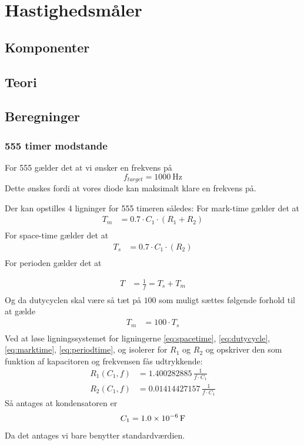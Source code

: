 \section{Hastighedsmåler}


\subsection{Komponenter}

\subsection{Teori}



\subsection{Beregninger}
\subsubsection{555 timer modstande}
For 555 gælder det at vi ønsker en frekvens på 
\[
	f_{target} =  \SI{1000}{\hertz}
\]
Dette ønskes fordi at vores diode kan maksimalt klare en frekvens på.

Der kan opstilles 4 ligninger for 555 timeren således: 
For mark-time gælder det at
\begin{align}
	T_m &= 0.7 \cdot C_1 \cdot (R_1 + R_2) \label{eq:marktime} \\
\end{align}
For space-time gælder det at 
\begin{align}
	T_s &= 0.7 \cdot C_1 \cdot (R_2) \label{eq:spacetime} \\
\end{align}
For perioden gælder det at 

\begin{align}
	T &= \frac{1}{f} = T_s + T_m \label{eq:periodtime} \\
\end{align}
Og da dutycyclen skal være så tæt på $100$ som muligt sættes følgende forhold til at gælde
\begin{align}
	T_m &= 100 \cdot  T_s \label{eq:dutycycle} \\
\end{align}
Ved at løse ligningssystemet for ligningerne \ref{eq:spacetime}, \ref{eq:dutycycle}, \ref{eq:marktime}, \ref{eq:periodtime}, og isolerer for $R_1$ og $R_2$ og opskriver den som funktion af kapacitoren og frekvensen fås udtrykkende:
\begin{align}
	R_{1} \left( C_1,f \right) &= 1.400282885\,{\frac {1}{f \cdot C_1}} \\[2ex]
	R_{2} \left( C_1,f \right) &= 0.01414427157\,{\frac {1}{f \cdot C_1}}
\end{align}
Så antages at kondensatoren er 
\[
	C_1 = \SI{1.0d-6}{\farad}
\]
Da det antages vi bare benytter standardværdien. 

